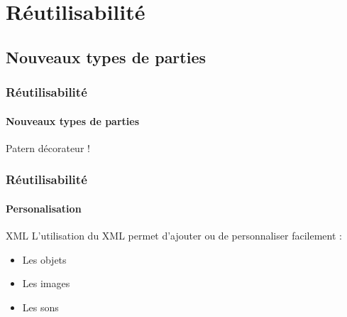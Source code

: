 \section{Réutilisabilité}
\subsection{Nouveaux types de parties}

	\begin{frame}
	\frametitle{Réutilisabilité}
	\framesubtitle{Nouveaux types de parties}
	
		Patern décorateur !
	
	\end{frame}
	
	
	\begin{frame}
	\frametitle{Réutilisabilité}
	\framesubtitle{Personalisation}
	
		\begin{block}{XML}
			L'utilisation du XML permet d'ajouter ou de personnaliser facilement :
			\begin{itemize}
				\item Les objets
				\item Les images
				\item Les sons
			\end{itemize}
		\end{block}
	
	\end{frame}